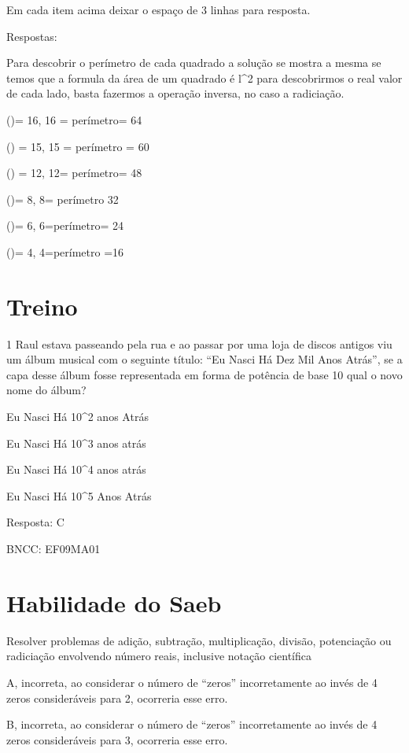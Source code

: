 Em cada item acima deixar o espaço de 3 linhas para resposta.

Respostas:

Para descobrir o perímetro de cada quadrado a solução se mostra a mesma
se temos que a formula da área de um quadrado é l^2 para descobrirmos o
real valor de cada lado, basta fazermos a operação inversa, no caso a
radiciação.

\item ()= 16, 16 = perímetro= 64
\item () = 15, 15 = perímetro = 60
\item () = 12, 12= perímetro= 48
\item ()= 8, 8= perímetro 32
\item ()= 6, 6=perímetro= 24
\item ()= 4, 4=perímetro =16

\section{Treino}

\num{1} Raul estava passeando pela rua e ao passar por uma loja de discos
antigos viu um álbum musical com o seguinte título: ``Eu Nasci Há Dez
Mil Anos Atrás'', se a capa desse álbum fosse representada em forma de
potência de base 10 qual o novo nome do álbum?

\item Eu Nasci Há 10^2 anos Atrás
\item Eu Nasci Há 10^3 anos atrás
\item Eu Nasci Há 10^4 anos atrás
\item Eu Nasci Há 10^5 Anos Atrás

Resposta: C

BNCC: EF09MA01

\section{Habilidade do Saeb}

Resolver problemas de adição, subtração, multiplicação, divisão,
potenciação ou radiciação envolvendo número reais, inclusive notação
científica

A, incorreta, ao considerar o número de ``zeros'' incorretamente ao
invés de 4 zeros consideráveis para 2, ocorreria esse erro.

B, incorreta, ao considerar o número de ``zeros'' incorretamente ao
invés de 4 zeros consideráveis para 3, ocorreria esse erro.


